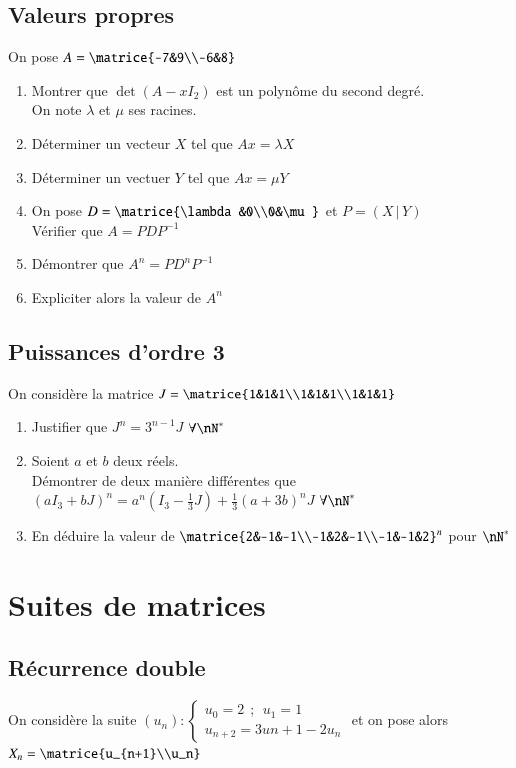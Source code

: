 \documentclass[oneside,12pt]{article}          %
\begin{document}
\subsection{Valeurs propres}
On pose $A=\matrice{-7&9\\-6&8}$
\begin{enumerate}
    \item Montrer que $\det(A-xI_2)$ est un polynôme du second degré.\\
    On note $\lambda$ et $\mu$ ses racines.
    \item Déterminer un vecteur $X$ tel que $Ax=\lambda X$
    \item Déterminer un vectuer $Y$ tel que $Ax = \mu Y$
    \item On pose $D=\matrice{\lambda&0\\0&\mu}$ et $P=(X\,|\,Y)$\\
    Vérifier que $A=PDP^{-1}$
    \item Démontrer que $A^n=PD^nP^{-1}$
    \item Expliciter alors la valeur de $A^n$
\end{enumerate}



\subsection{Puissances d'ordre 3}
On considère la matrice $J=\matrice{1&1&1\\1&1&1\\1&1&1}$
\begin{enumerate}
    \item Justifier que $J^n=3^{n-1}J$ \quad $\forall \nN^*$
    \item Soient $a$ et $b$ deux réels.\\
    Démontrer de deux manière différentes que $(aI_3+bJ)^n=a^n(I_3-\frac{1}{3}J)+\frac{1}{3}(a+3b)^nJ$ \quad $\forall \nN^*$
    \item En déduire la valeur de $\matrice{2&-1&-1\\-1&2&-1\\-1&-1&2}^n$ pour $\nN^*$
\end{enumerate}



\section{Suites de matrices}

\subsection{Récurrence double}
On considère la suite $(u_n):\begin{cases}u_0=2~~;~~u_1=1\\u_{n+2}=3u{n+1}-2u_n\end{cases}$ et on pose alors $X_n=\matrice{u_{n+1}\\u_n}$
\end{document}
